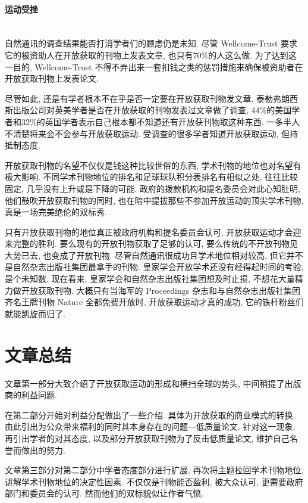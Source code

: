 \documentclass[a4paper, 12pt, UTF8]{article}
\begin{document}
\paragraph*{\large 运动受挫} \hspace{10pt} \\

自然通讯的调查结果能否打消学者们的顾虑仍是未知. 尽管 Wellcome-Trust 要求它的被资助人在开放获取的刊物上发表文章, 也只有70\%的人这么做. 为了达到这一目的, Wellcome-Trust 不得不弄出来一套扣钱之类的惩罚措施来确保被资助者在开放获取刊物上发表论文.

尽管如此, 还是有学者根本不在乎是否一定要在开放获取刊物发文章. 泰勒弗朗西斯出版公司对英美学者是否在开放获取的刊物发表过文章做了调查, 44\%的美国学者和32\%的英国学者表示自己根本都不知道还有开放获刊物取这种东西. 一多半人不清楚将来会不会参与开放获取运动. 受调查的很多学者知道开放获取运动, 但持抵制态度.

开放获取刊物的名望不仅仅是钱这种比较世俗的东西, 学术刊物的地位也对名望有极大影响. 不同学术刊物地位的排名和足球球队积分表排名有相似之处, 往往比较固定, 几乎没有上升或是下降的可能. 政府的拨款机构和提名委员会对此心知肚明, 他们鼓吹开放获取刊物的同时, 也在暗中提拔那些不参加开放运动的顶尖学术刊物. 真是一场完美绝伦的双标秀.

只有开放获取刊物的地位真正被政府机构和提名委员会认可, 开放获取运动才会迎来完整的胜利. 要么现有的开放刊物获取了足够的认可, 要么传统的不开放刊物见大势已去, 也变成了开放刊物. 尽管自然通讯很成功且学术地位相对较高, 但它并不是自然杂志出版社集团最拿手的刊物. 皇家学会开放学术还没有经得起时间的考验, 是个未知数. 现在看来, 皇家学会和自然杂志出版社集团想及时止损, 不想花大量精力做开放获取刊物. 大概只有当海军的 Proceedings 杂志和与自然杂志出版社集团齐名王牌刊物 Nature 全都免费开放时, 开放获取运动才真的成功, 它的铁杆粉丝们就能凯旋而归了.


\section{文章总结}
文章第一部分大致介绍了开放获取运动的形成和横扫全球的势头, 中间稍提了出版商的利益问题. 

在第二部分开始对利益分配做出了一些介绍. 具体为开放获取的商业模式的转换, 由此引出为公众带来福利的同时其本身存在的问题---低质量论文. 针对这一现象, 再引出学者的对其态度, 以及部分开放获取刊物为了反击低质量论文, 维护自己名誉而做出的努力. 

文章第三部分对第二部分中学者态度部分进行扩展, 再次将主题拉回学术刊物地位, 讲解学术刊物地位的决定性因素. 不仅仅是刊物能否盈利, 被大众认可, 更需要政府部门和委员会的认可. 然而他们的双标貌似让作者气愤. 
\end{document}
